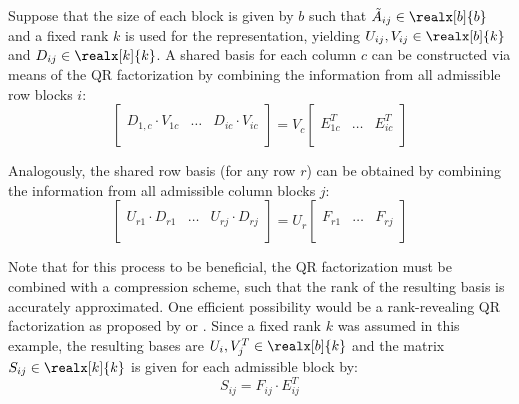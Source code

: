 \noindent Suppose that the size of each block is given by $b$ such that $\Tilde{A}_{ij} \in \realx[b]{b}$ and a fixed rank $k$ is used for the representation, yielding $U_{ij}, V_{ij} \in \realx[b]{k}$ and $D_{ij} \in \realx[k]{k}$. A shared basis for each column $c$ can be constructed via means of the QR factorization by combining the information from all admissible row blocks $i$:
\begin{equation}
  \left[
    \begin{array}{c|c|c}
      & & \\
      D_{1,c}\cdot V_{1c} &\dots & D_{ic}\cdot V_{ic} \\
      & & \\
    \end{array}
  \right] = V_c
  \left[
    \begin{array}{c|c|c}
      & & \\
      E_{1c}^T &\dots & E_{ic}^T \\
      & & \\
    \end{array}
  \right]
\end{equation}

\noindent Analogously, the shared row basis (for any row $r$) can be obtained by combining the information from all admissible column blocks $j$:
\begin{equation}
  \left[
    \begin{array}{c|c|c}
      & & \\
      U_{r1}\cdot D_{r1} &\dots & U_{rj}\cdot D_{rj} \\
      & & \\
    \end{array}
  \right] = U_r
  \left[
    \begin{array}{c|c|c}
      & & \\
     F_{r1} &\dots & F_{rj} \\
      & & \\
    \end{array}
  \right]
\end{equation}

\noindent Note that for this process to be beneficial, the QR factorization must be combined with a compression scheme, such that the rank of the resulting basis is accurately approximated. One efficient possibility would be a rank-revealing QR factorization as proposed by \cite{hong_rank-revealing_1992} or \cite{gu_efficient_1996}. Since a fixed rank $k$ was assumed in this example, the resulting bases are $U_{i}, V^T_{j} \in \realx[b]{k}$ and the matrix $S_{ij} \in \realx[k]{k}$ is given for each admissible block by:
\begin{equation}
    S_{ij}=F_{ij} \cdot E_{ij}^T
\end{equation}

